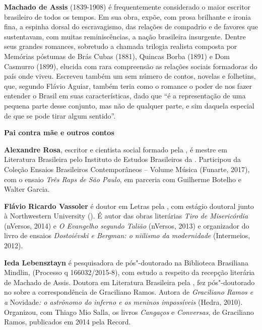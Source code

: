 \textbf{Machado de Assis} (1839-1908) é frequentemente considerado o maior escritor brasileiro de todos os tempos. Em sua obra, expõe, com prosa brilhante e ironia fina, a espinha dorsal do escravagismo, das relações de compadrio e de favores que sustentavam, com muitas reminiscências, a nação brasileira insurgente. Dentre seus grandes romances, sobretudo a chamada trilogia realista composta por Memórias póstumas de Brás Cubas (1881), Quincas Borba (1891) e Dom Casmurro (1899), elucida com rara compreensão as relações sociais formadoras do país onde viveu. Escreveu também um sem número de contos, novelas e folhetins, que, segundo Flávio Aguiar, também teria como o romance o poder de nos fazer entender o Brasil em suas características, dado que “é a representação de uma pequena parte desse conjunto, mas não de qualquer parte, e sim daquela especial de que se pode tirar algum sentido”.

\textbf{Pai contra mãe e outros contos} \lipsum[2]

\textbf{Alexandre Rosa}, escritor e
  cientista social formado pela , é mestre em Literatura
  Brasileira pelo Instituto de Estudos Brasileiros da . Participou da
  Coleção Ensaios Brasileiros Contemporâneos -- Volume Música (Funarte,
  2017), com o ensaio \emph{Três Raps de São Paulo}, em parceria com
  Guilherme Botelho e Walter Garcia.

\textbf{Flávio Ricardo Vassoler} é doutor em Letras pela , com estágio doutoral junto à
  Northwestern University (). É autor das obras literárias \emph{Tiro
  de Misericórdia} (nVersos, 2014) e \emph{O Evangelho segundo Talião}
  (nVersos, 2013) e organizador do livro de ensaios \emph{Dostoiévski e
  Bergman: o niilismo da modernidade} (Intermeios, 2012).

\textbf{Ieda Lebensztayn} é
  pesquisadora de pós"-doutorado na Biblioteca Brasiliana Mindlin,
   (Processo q 166032/2015-8), com estudo a
  respeito da recepção literária de Machado de Assis. Doutora em
  Literatura Brasileira pela , fez pós"-doutorado no 
  sobre a correspondência de Graciliano Ramos. Autora de
  \emph{Graciliano Ramos e a} Novidade\emph{: o astrônomo do inferno e
  os meninos impossíveis} (Hedra, 2010). Organizou, com Thiago Mio
  Salla, os livros \emph{Cangaços} e \emph{Conversas}, de Graciliano
  Ramos, publicados em 2014 pela Record.






